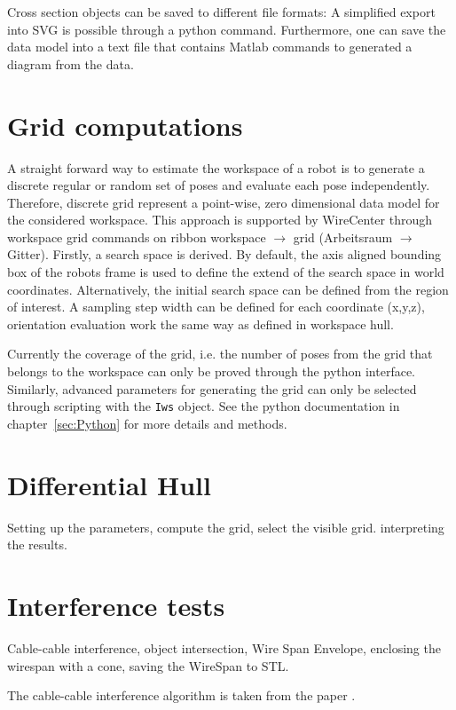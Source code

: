 \documentclass[11pt,a4paper,onepage,openany]{book}
\begin{document}
Cross section objects can be saved to different file formats: A simplified
export into SVG is possible through a python command. Furthermore, one can save
the data model into a text file that contains Matlab commands to generated a
diagram from the data.

\section{Grid computations}
A straight forward way to estimate the workspace of a robot is to generate a
discrete regular or random set of poses and evaluate each pose independently.
Therefore, discrete grid represent a point-wise, zero dimensional data model
for the considered workspace. This approach is supported by WireCenter through
workspace grid commands on ribbon workspace $\rightarrow$ grid (Arbeitsraum
$\rightarrow$ Gitter). Firstly, a search space is derived. By default, the axis
aligned bounding box of the robots frame is used to define the extend of the
search space in world coordinates. Alternatively, the initial search space can
be defined from the region of interest. A sampling step width can be defined
for each coordinate (x,y,z), orientation evaluation work the same way as
defined in workspace hull.

Currently the coverage of the grid, i.e. the number of poses from the grid that
belongs to the workspace can only be proved through the python interface.
Similarly, advanced parameters for generating the grid can only be selected
through scripting with the \texttt{Iws} object. See the python documentation in
chapter~\ref{sec:Python} for more details and methods.

\section{Differential Hull}
Setting up the parameters, compute the grid, select the visible grid.
interpreting the results.

\section{Interference tests}
Cable-cable interference, object intersection, Wire Span Envelope, enclosing
the wirespan with a cone, saving the WireSpan to STL.

The cable-cable interference algorithm is taken from the paper
\cite{Perreault2010}.
\end{document}
